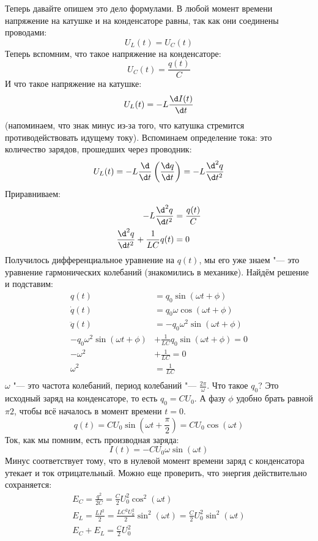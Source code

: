 
	Теперь давайте опишем это дело формулами.
	В любой момент времени напряжение на катушке и на конденсаторе равны, так как они соединены проводами:
	\[ U_L(t) = U_C(t) \]
	Теперь вспомним, что такое напряжение на конденсаторе:
	\[ U_C(t) = \frac{q(t)}{C} \]
	И что такое напряжение на катушке:
	\[ U_L(t) = -L \frac{\d I(t)}{\d t}\]
	(напоминаем, что знак минус из-за того, что катушка стремится противодействовать идущему току).
	Вспоминаем определение тока: это количество зарядов, прошедших через проводник:
	\[ U_L(t) = -L \frac{\d}{\d t}\left(\frac{\d q}{\d t}\right) = -L \frac{\d^2 q}{\d t ^2}\]
	Приравниваем:
	\begin{align*}
	-L \frac{\d^2 q}{\d t ^2} &= \frac{q(t)}{C} \\
	\frac{\d^2 q}{\d t ^2} + \frac{1}{LC} q(t) &= 0 \\
	\end{align*}
	Получилось дифференциальное уравнение на $q(t)$,
	мы его уже знаем "--- это уравнение гармонических колебаний (знакомились в механике).
	Найдём решение и подставим:
	\begin{align*}
	q(t) &= q_0 \sin(\omega t + \phi) \\
	\dot q(t) &= q_0 \omega \cos(\omega t + \phi) \\
	\ddot q(t) &= -q_0 \omega^2 \sin(\omega t + \phi) \\
	-q_0 \omega^2 \sin(\omega t + \phi) &+ \frac{1}{LC} q_0 \sin(\omega t + \phi) = 0 \\
	-\omega^2 &+ \frac{1}{LC} = 0 \\
	\omega^2 &= \frac{1}{LC} \\
	\end{align*}
	$\omega$ "--- это частота колебаний, период колебаний "--- $\frac{2\pi}{\omega}$.
	Что такое $q_0$?
	Это исходный заряд на конденсаторе, то есть $q_0 = CU_0$.
	А фазу $\phi$ удобно брать равной $\pi 2$, чтобы всё началось в момент времени $t=0$.
	\[
	q(t) = CU_0 \sin (\omega t + \frac \pi 2) = CU_0 \cos (\omega t)
	\]
	Ток, как мы помним, есть производная заряда:
	\[
	I(t) = -CU_0 \omega \sin (\omega t)
	\]
	Минус соответствует тому, что в нулевой момент времени заряд с конденсатора утекает и ток отрицательный.
	Можно еще проверить, что энергия действительно сохраняется:
	\begin{gather*}
	E_C = \frac{q^2}{2C} = \frac C 2 U_0^2 \cos^2 (\omega t ) \\
	E_L = \frac{LI^2}{2} = \frac{LC^2U_0^2}2 \sin^2 (\omega t) = \frac C 2 U_0^2 \sin^2 (\omega t) \\
	E_C + E_L = \frac C 2 U_0^2
	\end{gather*}

